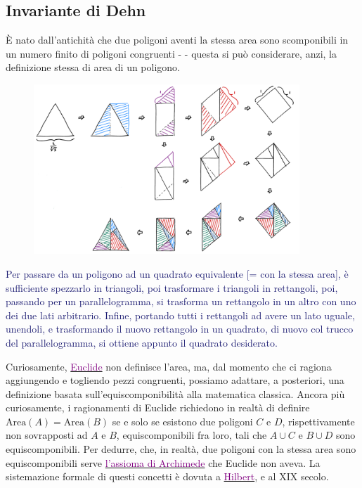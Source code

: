 \pagebreak
\subsection{Invariante di Dehn}

È nato dall'antichità che due poligoni aventi la stessa area sono scomponibili in un numero finito di poligoni congruenti -  - questa si può considerare, anzi, la definizione stessa di area di un poligono.

\begin{figure}[H]
	\centering
	\includegraphics[width = 10cm]{immagini/Dehn_1.png}
\end{figure}

\textcolor{MidnightBlue}{Per passare da un poligono ad un quadrato equivalente [= con la stessa area], è sufficiente spezzarlo in triangoli, poi trasformare i triangoli in rettangoli, poi, passando per un parallelogramma, si trasforma un rettangolo in un altro con uno dei due lati arbitrario.
Infine, portando tutti i rettangoli ad avere un lato uguale, unendoli, e trasformando il nuovo rettangolo in un quadrato, di nuovo col trucco del parallelogramma, si ottiene appunto il quadrato desiderato.}

\begin{note}
	Curiosamente, \href{https://en.wikipedia.org/wiki/Euclid}{\textcolor{purple}{Euclide}} non definisce l'area, ma, dal momento che ci ragiona aggiungendo e togliendo pezzi congruenti, possiamo adattare, a posteriori, una definizione basata sull'equiscomponibilità alla matematica classica.
	Ancora più curiosamente, i ragionamenti di Euclide richiedono in realtà di definire $\text{Area}(A) = \text{Area}(B)$ se e solo se esistono due poligoni $C$ e $D$, rispettivamente non sovrapposti ad $A$ e $B$, equiscomponibili fra loro, tali che $A \cup C$ e $B \cup D$
	sono equiscomponibili. Per dedurre, che, in realtà, due poligoni con la stessa area sono equiscomponibili serve \href{https://en.wikipedia.org/wiki/Archimedean_property}{\textcolor{purple}{l'assioma di Archimede}} che Euclide non aveva. La sistemazione formale di questi concetti è dovuta 
	a \href{https://en.wikipedia.org/wiki/David_Hilbert}{\textcolor{purple}{Hilbert}}, e al XIX secolo.
\end{note}

